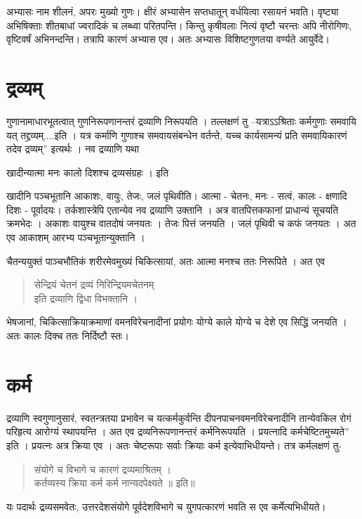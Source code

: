 अभ्यासः नाम शीलनं, अपरः मुख्यो गुणः। क्षीरं अभ्यासेन सप्तधातून् वर्धयित्वा रसायनं भवति। वृष्ट्या अभिषिक्ताः शीतबाधां ज्वरादिकं च लब्ध्वा परितपन्ति। किन्तु कृषीवलाः नित्यं वृष्टौ चरन्तः अपि नीरोगिणः, वृष्टिवर्षं अभिनन्दन्ति। तत्रापि कारणं अभ्यास एव। अतः अभ्यासः विशिष्टगुणतया वर्ण्यते आयुर्वेदे।

\section*{द्रव्यम्}

गुणानामाधारभूतत्वात् गुणनिरूपणानन्तरं द्रव्याणि निरूपयति । तल्लक्षणं तु –यत्राऽऽश्रिताः कर्मगुणाः समवायि यत् तद्द्रव्यम्....इति । यत्र कर्माणि गुणाश्च समवायसंबन्धेन वर्तन्ते, यच्च कार्यसामन्यं प्रति समवायिकारणं तदेव द्रव्यम्” इत्यर्थः । नव द्रव्याणि यथा \

खादीन्यात्मा मनः कालो दिशश्च द्रव्यसंग्रहः । इति


खादीनि पञ्चभूतानि  आकाशः, वायुः, तेजः, जलं पृथिवीति। आत्मा - चेतनः, मनः - सत्वं, कालः - क्षणादि दिशः - पूर्वादयः। तर्कशास्त्रेपि एतान्येव नव द्रव्याणि उक्तानि । अत्र वातपित्तकफानां प्राधान्यं सूचयति क्रमभेदः । अकाशः वायुश्च वातदोषं जनयतः । तेजः पित्तं जनयति । जलं पृथिवी च कफं जनयतः । अत एव आकाशम् आरभ्य पञ्चभूतान्युक्तानि ।

चैतन्ययुक्तं पाञ्चभौतिकं शरीरमेवमुख्यं चिकित्सायां, अतः आत्मा मनश्च ततः निरूपिते । अत एव
\begin{verse}
सेन्द्रियं चेतनं द्रव्यं निरिन्द्रियमचेतनम्\\
इति द्रव्याणि द्विधा विभक्तानि ।
\end{verse}
भेषजानां, चिकित्साक्रियाक्रमाणां वमनविरेचनादीनां प्रयोगः योग्ये काले योग्ये च देशे एव सिद्धिं जनयति । अतः कालः दिक्च ततः निर्दिष्टौ स्तः।

\section*{कर्म} 

द्रव्याणि स्वगुणानुसारं, स्वतन्त्रतया प्रभावेन च यत्कर्मकुर्वन्ति दीपनपाचनवमनविरेचनादीनि तान्येवकिल रोगं परिहृत्य आरोग्यं स्थापयन्ति । अत एव द्रव्यनिरूपणानन्तरं कर्मनिरूपयति । प्रयत्नादि कर्मचेष्टितमुच्यते” इति । प्रयत्नः अत्र क्रिया एव । अतः चेष्टरूपाः सर्वाः क्रियाः कर्म इत्येवाभिधीयन्ते। तत्र कर्मलक्षणं तु-
\begin{verse}
संयोगे च विभागे च कारणं द्रव्यमाश्रितम् ।\\
कर्तव्यस्य क्रिया कर्म कर्म नान्यदपेक्ष्यते ॥ इति॥
\end{verse}
यः पदार्थः द्रव्यसमवेतः, उत्तरदेशसंयोगे पूर्वदेशविभागे च युगपत्कारणं भवति स एव कर्मेत्यभिधीयते।

